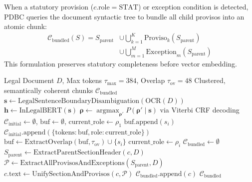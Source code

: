 \documentclass[conference]{IEEEtran}
\begin{document}
When a statutory provision ($c.\text{role} = \text{STAT}$) or exception condition is detected, PDBC queries the document syntactic tree to bundle all child provisos into an atomic chunk:
\begin{equation}
\begin{aligned}
\mathcal{C}_{\text{bundled}}(S) = S_{\text{parent}} &\cup \bigcup_{k=1}^K \text{Proviso}_k(S_{\text{parent}}) \\
&\cup \bigcup_{m=1}^M \text{Exception}_m(S_{\text{parent}})
\end{aligned}
\end{equation}
This formulation preserves statutory completeness before vector embedding.

\begin{algorithm}[!t]
\caption{Proviso-Aware Rhetorical Chunking and Bundling}
\label{alg:chunking}
\begin{algorithmic}[1]
\Require Legal Document $D$, Max tokens $\tau_{\max}=384$, Overlap $\tau_{\text{ov}}=48$
\Ensure Clustered, semantically coherent chunks $\mathcal{C}_{\text{bundled}}$
\State $\mathbf{s} \gets \text{LegalSentenceBoundaryDisambiguation}(\text{OCR}(D))$
\State $\mathbf{h} \gets \text{InLegalBERT}(\mathbf{s})$
\State $\mathbf{\rho} \gets \operatorname{argmax}_{\mathbf{\rho}'} P(\mathbf{\rho}' \mid \mathbf{s})$ via Viterbi CRF decoding
\State $\mathcal{C}_{\text{initial}} \gets \emptyset$, $\text{buf} \gets \emptyset$, $\text{current\_role} \gets \rho_1$
        \State $\text{buf}.\text{append}(s_i)$
    \Else
        \State $\mathcal{C}_{\text{initial}}.\text{append}(\{\text{tokens}: \text{buf}, \text{role}: \text{current\_role}\})$
        \State $\text{buf} \gets \text{ExtractOverlap}(\text{buf}, \tau_{\text{ov}}) \cup \{s_i\}$
        \State $\text{current\_role} \gets \rho_i$
    \EndIf
\EndFor
\State $\mathcal{C}_{\text{bundled}} \gets \emptyset$
        \State $S_{\text{parent}} \gets \text{ExtractParentSectionHeader}(c, D)$
        \State $\mathcal{P} \gets \text{ExtractAllProvisosAndExceptions}(S_{\text{parent}}, D)$
        \State $c.\text{text} \gets \text{UnifySectionAndProvisos}(c, \mathcal{P})$
    \EndIf
    \State $\mathcal{C}_{\text{bundled}}.\text{append}(c)$
\EndFor
\State \Return $\mathcal{C}_{\text{bundled}}$
\end{algorithmic}
\end{algorithm}
\end{document}
